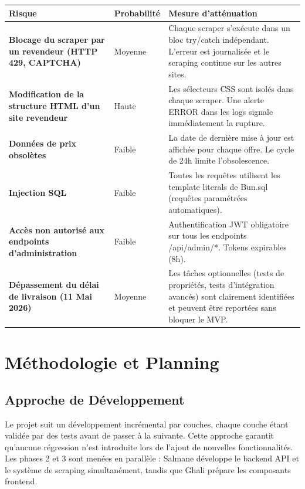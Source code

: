 \documentclass[12pt,a4paper]{article}
\begin{document}
\begin{longtable}{>{\bfseries}p{4cm} p{3.5cm} p{6cm}}
\toprule
\textbf{Risque} & \textbf{Probabilité} & \textbf{Mesure d'atténuation} \\
\midrule
\endhead
Blocage du scraper par un revendeur (HTTP 429, CAPTCHA) &
Moyenne &
Chaque scraper s'exécute dans un bloc try/catch indépendant. L'erreur est journalisée et le scraping continue sur les autres sites. \\
\midrule
Modification de la structure HTML d'un site revendeur &
Haute &
Les sélecteurs CSS sont isolés dans chaque scraper. Une alerte ERROR dans les logs signale immédiatement la rupture. \\
\midrule
Données de prix obsolètes &
Faible &
La date de dernière mise à jour est affichée pour chaque offre. Le cycle de 24h limite l'obsolescence. \\
\midrule
Injection SQL &
Faible &
Toutes les requêtes utilisent les template literals de Bun.sql (requêtes paramétrées automatiques). \\
\midrule
Accès non autorisé aux endpoints d'administration &
Faible &
Authentification JWT obligatoire sur tous les endpoints /api/admin/*. Tokens expirables (8h). \\
\midrule
Dépassement du délai de livraison (11 Mai 2026) &
Moyenne &
Les tâches optionnelles (tests de propriétés, tests d'intégration avancés) sont clairement identifiées et peuvent être reportées sans bloquer le MVP. \\
\bottomrule
\end{longtable}

\section{Méthodologie et Planning}

\subsection{Approche de Développement}

Le projet suit un développement incrémental par couches, chaque couche étant validée par des tests avant de passer à la suivante. Cette approche garantit qu'aucune régression n'est introduite lors de l'ajout de nouvelles fonctionnalités. Les phases 2 et 3 sont menées en parallèle : Salmane développe le backend API et le système de scraping simultanément, tandis que Ghali prépare les composants frontend.
\end{document}
